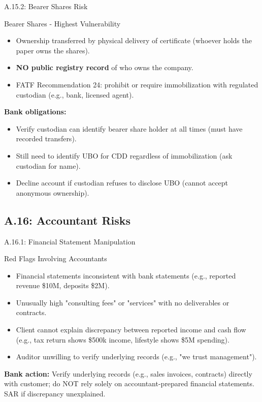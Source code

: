 \documentclass{beamer}
\begin{document}
	\begin{frame}{A.15.2: Bearer Shares Risk}
		\begin{block}{Bearer Shares - Highest Vulnerability}
			\begin{itemize}
				\item Ownership transferred by physical delivery of certificate (whoever holds the paper owns the shares).
				\item \textbf{NO public registry record} of who owns the company.
				\item FATF Recommendation 24: prohibit or require immobilization with regulated custodian (e.g., bank, licensed agent).
			\end{itemize}
		\end{block}
		\textbf{Bank obligations:}
		\begin{itemize}
			\item Verify custodian can identify bearer share holder at all times (must have recorded transfers).
			\item Still need to identify UBO for CDD regardless of immobilization (ask custodian for name).
			\item Decline account if custodian refuses to disclose UBO (cannot accept anonymous ownership).
		\end{itemize}
	\end{frame}
	
	\subsection{A.16: Accountant Risks}
	
	\begin{frame}{A.16.1: Financial Statement Manipulation}
		\begin{block}{Red Flags Involving Accountants}
			\begin{itemize}
				\item Financial statements inconsistent with bank statements (e.g., reported revenue \$10M, deposits \$2M).
				\item Unusually high "consulting fees" or "services" with no deliverables or contracts.
				\item Client cannot explain discrepancy between reported income and cash flow (e.g., tax return shows \$500k income, lifestyle shows \$5M spending).
				\item Auditor unwilling to verify underlying records (e.g., "we trust management").
			\end{itemize}
		\end{block}
		\textbf{Bank action:} Verify underlying records (e.g., sales invoices, contracts) directly with customer; do NOT rely solely on accountant-prepared financial statements. SAR if discrepancy unexplained.
	\end{frame}
	
\end{document}
